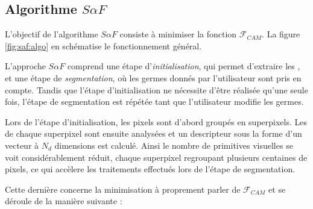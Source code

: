 \subsection{Algorithme $S \alpha F$ }

L'objectif de l'algorithme $S \alpha F$ consiste à minimiser la fonction $\mathcal{F}_{CAM}$. La figure \ref{fig:saf:algo} en schématise le fonctionnement général. 

L'approche $S \alpha F$ comprend une étape d'\emph{initialisation}, qui permet d'extraire les , et une étape de \emph{segmentation}, où les germes donnés par l'utilisateur sont pris en compte. Tandis que l'étape d'initialisation ne nécessite d'être réalisée qu'une seule fois, l'étape de segmentation est répétée tant que l'utilisateur modifie les germes. 

Lors de l'étape d'initialisation, les pixels sont d'abord groupés en superpixels. Les  de chaque superpixel sont ensuite analysées et un descripteur sous la forme d'un vecteur à $N_{d}$ dimensions est calculé. Ainsi\modif{,} le nombre de primitives visuelles se voit considérablement réduit, chaque superpixel regroupant plusieurs centaines de pixels, ce qui accèlere les traitements effectués lors de l'étape de segmentation. 

Cette dernière concerne la minimisation à proprement parler de $\mathcal{F}_{CAM}$ et se déroule de la manière suivante :

